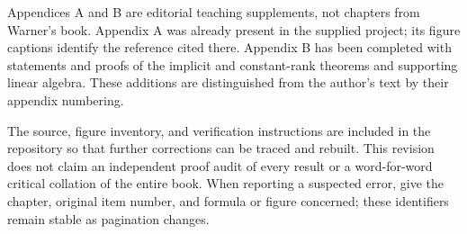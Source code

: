 Appendices A and B are editorial teaching supplements, not chapters from
Warner's book. Appendix A was already present in the supplied project; its
figure captions identify the reference cited there. Appendix B has been
completed with statements and proofs of the implicit and constant-rank
theorems and supporting linear algebra. These additions are distinguished
from the author's text by their appendix numbering.

The source, figure inventory, and verification instructions are included
in the repository so that further corrections can be traced and rebuilt.
This revision does not claim an independent proof audit of every result
or a word-for-word critical collation of the entire book. When reporting a
suspected error, give the chapter, original item number, and formula or
figure concerned; these identifiers remain stable as pagination changes.
